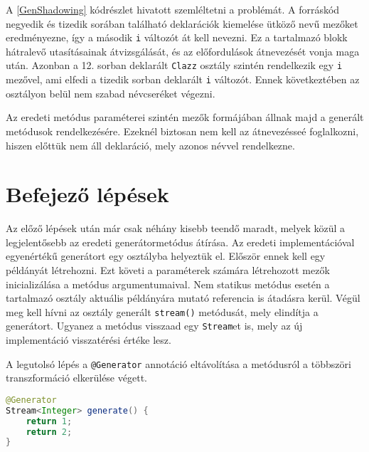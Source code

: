 A \ref{GenShadowing} kódrészlet hivatott szemléltetni a problémát. A forráskód negyedik és tizedik sorában található deklarációk kiemelése ütköző nevű mezőket eredményezne, így a második \texttt{i} változót át kell nevezni. Ez a tartalmazó blokk hátralevő utasításainak átvizsgálását, és az előfordulások átnevezését vonja maga után. Azonban a 12. sorban deklarált \texttt{Clazz} osztály szintén rendelkezik egy \texttt{i} mezővel, ami elfedi a tizedik sorban deklarált \texttt{i} változót. Ennek következtében az osztályon belül nem szabad névcseréket végezni. 

Az eredeti metódus paraméterei szintén mezők formájában állnak majd a generált metódusok rendelkezésére. Ezeknél biztosan nem kell az átnevezésseé foglalkozni, hiszen előttük nem áll deklaráció, mely azonos névvel rendelkezne.

\section{Befejező lépések}

Az előző lépések után már csak néhány kisebb teendő maradt, melyek közül a legjelentősebb az eredeti generátormetódus átírása. Az eredeti implementációval egyenértékű generátort egy osztályba helyeztük el. Először ennek kell egy példányát létrehozni. Ezt követi a paraméterek számára létrehozott mezők inicializálása a metódus argumentumaival. Nem statikus metódus esetén a tartalmazó osztály aktuális példányára mutató referencia is átadásra kerül. Végül meg kell hívni az osztály generált \texttt{stream()} metódusát, mely elindítja a generátort. Ugyanez a metódus visszaad egy \texttt{Stream}et is, mely az új implementáció visszatérési értéke lesz.

A legutolsó lépés a \texttt{@Generator} annotáció eltávolítása a metódusról a többszöri transzformáció elkerülése végett.

\begin{lstlisting}[language=Java, caption={Az $1, 2$ sorozatot előállító generátor a transzformáció előtt}, captionpos=b, label=GenBefore, escapechar=$]
@Generator
Stream<Integer> generate() {
    return 1;
    return 2;
}
\end{lstlisting}

